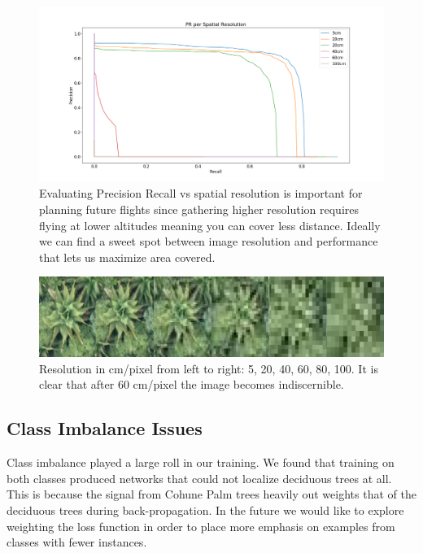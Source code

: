 \begin{figure}[ht]
\includegraphics[width=1.0\textwidth]{Figures/PR-resolution.png}
\caption{Evaluating Precision Recall vs spatial resolution is important for planning future flights since gathering higher resolution requires flying at lower altitudes meaning you can cover less distance. Ideally we can find a sweet spot between image resolution and performance that lets us maximize area covered.}
\label{fig:PR-resolution}
\end{figure}

\begin{figure}[ht]
\includegraphics[width=1.0\textwidth]{Figures/Palm-resolution.png}
\caption{Resolution in cm/pixel from left to right: 5, 20, 40, 60, 80, 100. It is clear that after 60 cm/pixel the image becomes indiscernible.}
\label{fig:Palm-resolution}
\end{figure}

\subsection{Class Imbalance Issues}

Class imbalance played a large roll in our training. We found that training on both classes produced networks that could not localize deciduous trees at all. This is because the signal from Cohune Palm trees heavily out weights that of the deciduous trees during back-propagation. In the future we would like to explore weighting the loss function in order to place more emphasis on examples from classes with fewer instances.

